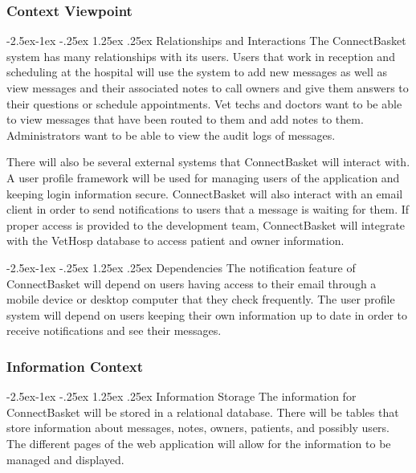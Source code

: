 \documentclass[onecolumn, draftclsnofoot,10pt, compsoc]{IEEEtran}
\makeatletter
\renewcommand\paragraph{\@startsection{paragraph}{4}{\z@}%
            {-2.5ex\@plus -1ex \@minus -.25ex}%
            {1.25ex \@plus .25ex}%
            {\normalfont\normalsize\bfseries}}
\makeatother
\begin{document}
\subsubsection{Context Viewpoint}

\paragraph{Relationships and Interactions}
The ConnectBasket system has many relationships with its users. Users that work in reception and scheduling at the hospital will use the system to add new messages as well as view messages and their associated notes to call owners and give them answers to their questions or schedule appointments. Vet techs and doctors want to be able to view messages that have been routed to them and add notes to them. Administrators want to be able to view the audit logs of messages.

There will also be several external systems that ConnectBasket will interact with. A user profile framework will be used for managing users of the application and keeping login information secure. ConnectBasket will also interact with an email client in order to send notifications to users that a message is waiting for them. If proper access is provided to the development team, ConnectBasket will integrate with the VetHosp database to access patient and owner information.

\paragraph{Dependencies}
The notification feature of ConnectBasket will depend on users having access to their email through a mobile device or desktop computer that they check frequently. The user profile system will depend on users keeping their own information up to date in order to receive notifications and see their messages.

\subsubsection{Information Context}

\paragraph{Information Storage}
The information for ConnectBasket will be stored in a relational database. There will be tables that store information about messages, notes, owners, patients, and possibly users.  The different pages of the web application will allow for the information to be managed and displayed.
\end{document}
